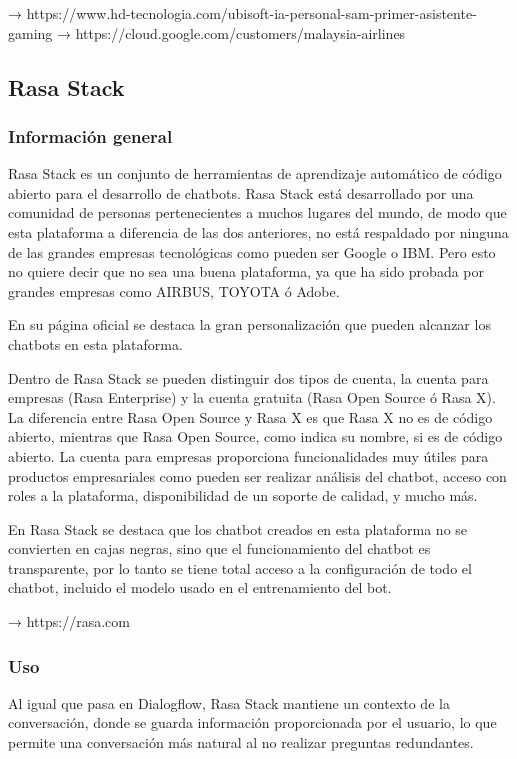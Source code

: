 → https://www.hd-tecnologia.com/ubisoft-ia-personal-sam-primer-asistente-gaming
→ https://cloud.google.com/customers/malaysia-airlines


\subsection{Rasa Stack}

\subsubsection*{Información general}

Rasa Stack es un conjunto de herramientas de aprendizaje automático de código abierto para el desarrollo de chatbots. Rasa Stack está desarrollado por una comunidad de personas pertenecientes a muchos lugares del mundo, de modo que esta plataforma a diferencia de las dos anteriores, no está respaldado por ninguna de las grandes empresas tecnológicas como pueden ser Google o IBM. Pero esto no quiere decir que no sea una buena plataforma, ya que ha sido probada por grandes empresas como AIRBUS, TOYOTA ó Adobe.

En su página oficial \cite{RefWorks:RefID:20-2020rasa} se destaca la gran personalización que pueden alcanzar los chatbots en esta plataforma.

Dentro de Rasa Stack se pueden distinguir dos tipos de cuenta, la cuenta para empresas (Rasa Enterprise) y la cuenta gratuita (Rasa Open Source ó Rasa X). La diferencia entre Rasa Open Source y Rasa X es que Rasa X no es de código abierto, mientras que Rasa Open Source, como indica su nombre, si es de código abierto. La cuenta para empresas proporciona funcionalidades muy útiles para productos empresariales como pueden ser realizar análisis del chatbot, acceso con roles a la plataforma, disponibilidad de un soporte de calidad, y mucho más.

En Rasa Stack se destaca que los chatbot creados en esta plataforma no se convierten en cajas negras, sino que el funcionamiento del chatbot es transparente, por lo tanto se tiene total acceso a la configuración de todo el chatbot, incluido el modelo usado en el entrenamiento del bot.


→ https://rasa.com

\subsubsection*{Uso}

Al igual que pasa en Dialogflow, Rasa Stack mantiene un contexto de la conversación, donde se guarda información proporcionada por el usuario, lo que permite una conversación más natural al no realizar preguntas redundantes.

